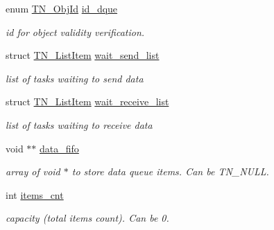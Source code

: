 \begin{DoxyCompactItemize}
\item 
enum \hyperlink{tn__common_8h_ae779dd1f6735f6e139fb70acd004d976}{T\+N\+\_\+\+Obj\+Id} \hyperlink{structTN__DQueue_afce2b73b8afc3b1537e34ff3a4a7114c}{id\+\_\+dque}
\begin{DoxyCompactList}\small\item\em id for object validity verification. \end{DoxyCompactList}\item 
\mbox{\label{structTN__DQueue_a5094327a117b22df9d3b09ee45204c62}} 
struct \hyperlink{structTN__ListItem}{T\+N\+\_\+\+List\+Item} \hyperlink{structTN__DQueue_a5094327a117b22df9d3b09ee45204c62}{wait\+\_\+send\+\_\+list}
\begin{DoxyCompactList}\small\item\em list of tasks waiting to send data \end{DoxyCompactList}\item 
\mbox{\label{structTN__DQueue_a2cb2cfdd31937d5d121a72b4e2ee6f1b}} 
struct \hyperlink{structTN__ListItem}{T\+N\+\_\+\+List\+Item} \hyperlink{structTN__DQueue_a2cb2cfdd31937d5d121a72b4e2ee6f1b}{wait\+\_\+receive\+\_\+list}
\begin{DoxyCompactList}\small\item\em list of tasks waiting to receive data \end{DoxyCompactList}\item 
\mbox{\label{structTN__DQueue_aba382885049d3df6ed8dbb8736ced1ad}} 
void $\ast$$\ast$ \hyperlink{structTN__DQueue_aba382885049d3df6ed8dbb8736ced1ad}{data\+\_\+fifo}
\begin{DoxyCompactList}\small\item\em array of {\ttfamily void $\ast$} to store data queue items. Can be {\ttfamily T\+N\+\_\+\+N\+U\+LL}. \end{DoxyCompactList}\item 
\mbox{\label{structTN__DQueue_a1c0167117cef4412bbbac2aff3334e7b}} 
int \hyperlink{structTN__DQueue_a1c0167117cef4412bbbac2aff3334e7b}{items\+\_\+cnt}
\begin{DoxyCompactList}\small\item\em capacity (total items count). Can be 0. \end{DoxyCompactList}\item 
$$
\end{DoxyCompactItemize}
